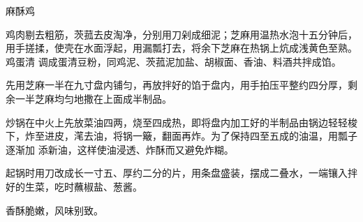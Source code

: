 %
%
%
%
%
%
%
\begin{recipe}{麻酥鸡}

\ingredients


\preparation

\step 鸡肉剔去粗筋，茨菰去皮淘净，分别用刀剁成细泥；芝麻用温热水泡十五分钟后，
用手搓揉，使壳在水面浮起，用漏瓢打去，将余下芝麻在热锅上炕成浅黄色至熟。鸡蛋清
调成蛋清豆粉，同鸡泥、茨菰泥加盐、胡椒面、香油、料酒共拌成馅。

\step 先用芝麻一半在九寸盘内铺匀，再放拌好的馅于盘内，用手拍压平整约四分厚，剩
余一半芝麻均匀地撒在上面成半制品。

\step 炒锅在中火上先放菜油四两，烧至四成热，即将盘内加工好的半制品由锅边轻轻梭
下，炸至进皮，滗去油，将锅一簸，翻面再炸。为了保持四至五成的油温，用瓢子逐渐加
添新油，这样使油浸透、炸酥而又避免炸糊。

\step 起锅时用刀改成长一寸五、厚约二分的片，用条盘盛装，摆成二叠水，一端镶入拌
好的生菜，吃时蘸椒盐、葱酱。

\features

香酥脆嫩，风味别致。

\end{recipe}


